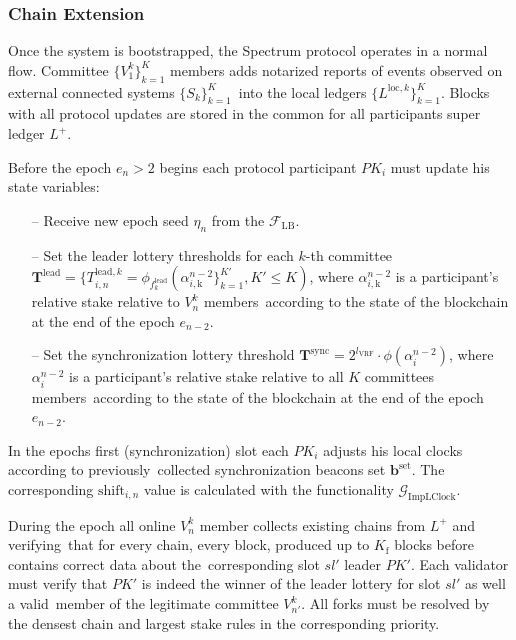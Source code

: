 \subsubsection{Chain Extension}\label{subsubsec:chain-extension}
Once the system is bootstrapped, the Spectrum protocol operates in a normal flow.
Committee $\{V^k_1\}_{k=1}^K$ members adds notarized reports of events observed on external connected systems $\{S_k\}_{k=1}^K$\
into the local ledgers $\{L^{\text{loc}, k}\}_{k=1}^K$.
Blocks with all protocol updates are stored in the common for all participants super ledger $L^+$.
\begin{legal}
    \item Before the epoch $e_n > 2$ begins each protocol participant $PK_i$ must update his state variables:
    \begin{itemize}
        \item[--] Receive new epoch seed $\eta_n$ from the ${\mathcal{F}}_{\text{LB}}$.
        \item [--] Set the leader lottery thresholds for each $k$-th committee $\mathbf{T}^{\text{lead}} = \{T_{i, n}^{\text{lead}, k} = \phi_{f^{\text{lead}}_k}(\alpha^{n-2}_{i, \text{k}}\}_{k=1}^{K'}, K' \leq K)$,
        where $\alpha^{n-2}_{i, \text{k}}$ is a participant's relative stake relative to $V^k_n$ members\
        according to the state of the blockchain at the end of the epoch $e_{n-2}$.
        \item [--] Set the synchronization lottery threshold $\mathbf{T}^{\text{sync}} = 2^{l_{\text{VRF}}}\cdot\phi(\alpha^{n-2}_{i})$,
        where $\alpha^{n-2}_{i}$ is a participant's relative stake relative to all $K$ committees members\
        according to the state of the blockchain at the end of the epoch $e_{n-2}$.
    \end{itemize}

    \item In the epochs first (synchronization) slot each $PK_i$ adjusts his local clocks according to previously\
    collected synchronization beacons set $\mathbf{b}^{\text{set}}$.
    The corresponding $\text{shift}_{i, n}$ value is calculated with the functionality $\mathcal{G}_{\text{ImpLClock}}$.

    \item During the epoch all online $V^k_n$ member collects existing chains from $L^+$ and verifying\
    that for every chain, every block, produced up to $K_{\text{f}}$ blocks before contains correct data about the\
    corresponding slot $sl'$ leader $PK'$.
    Each validator must verify that $PK'$ is indeed the winner of the leader lottery for slot $sl'$ as well a valid\
    member of the legitimate committee $V^k_{n'}$.
    All forks must be resolved by the densest chain and largest stake rules in the corresponding priority.


\end{legal}
